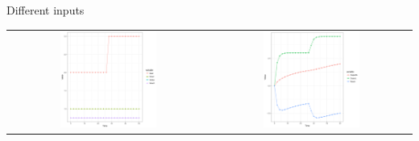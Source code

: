 \documentclass{beamer}
\begin{document}
\begin{frame}{Different inputs}
	\begin{table}
		\begin{tabular}{ cc }
			\includegraphics[width=0.5\textwidth]{issues_step_input.png} &
			\includegraphics[width=0.5\textwidth]{issues_step_output.png} \\
		\end{tabular}
	\end{table}
\end{frame}
\end{document}
